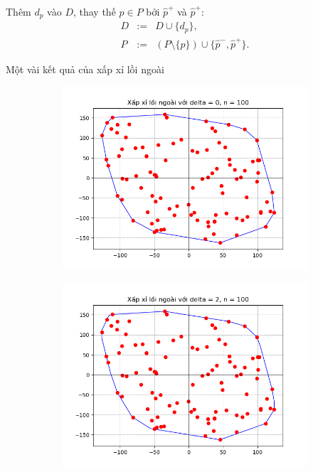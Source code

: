 \documentclass[11pt]{beamer}
\theoremstyle{definition}
\theoremstyle{plain}
\theoremstyle{plain}
\theoremstyle{remark}
\begin{document}
	\begin{frame}
		Thêm $d_p$ vào $D$, thay thế $p \in P$ bởi $\hat p^+$ và $\hat p^+$:
		\begin{equation}\label{newDP1}
			\begin{array}{lcl}
				D &:=& D \cup \{d_{p}\}, \\
				P &:=&(P \setminus \{p\}) \cup \{\hat p^-, \hat p^+\}.
			\end{array}
		\end{equation}
		
	\end{frame}
	
\begin{frame}{Một vài kết quả của xấp xỉ lồi ngoài}
	\begin{figure}[htbp]
		\centering
		\begin{subfigure}[b]{0.4\textwidth}
			\includegraphics[width=\textwidth]{outer_delta0}
		
			\label{fig:outerdelta0}
		\end{subfigure}
		\hfill
		\begin{subfigure}[b]{0.4\textwidth}
			\includegraphics[width=\textwidth]{outer_delta2}
		

\end{subfigure}
\end{figure}
\end{frame}
\end{document}
